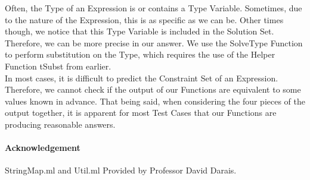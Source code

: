 \documentclass{article}
\begin{document}
Often, the Type of an Expression is or contains a Type Variable. Sometimes, due to the nature of the Expression, this is as specific as we can be. Other times though, we notice that this Type Variable is included in the Solution Set. Therefore, we can be more precise in our answer. We use the SolveType Function to perform substitution on the Type, which requires the use of the Helper Function tSubst from earlier.\\

In most cases, it is difficult to predict the Constraint Set of an Expression. Therefore, we cannot check if the output of our Functions are equivalent to some values known in advance. That being said, when considering the four pieces of the output together, it is apparent for most Test Cases that our Functions are producing reasonable answers.

\paragraph{Acknowledgement}
StringMap.ml and Util.ml Provided by Professor David Darais.
\end{document}
